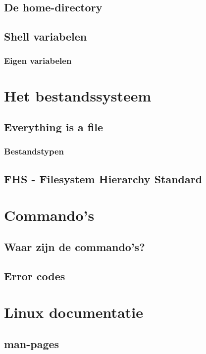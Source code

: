\documentclass[a4paper,12pt,twoside,openright,titlepage]{book}
\begin{document}
\section{De home-directory}

\section{Shell variabelen}

\subsection{Eigen variabelen}


\chapter{Het bestandssysteem}
\section{Everything is a file}

\subsection{Bestandstypen}

\section{FHS - Filesystem Hierarchy Standard}


\chapter{Commando's}

\section{Waar zijn de commando's?}

\section{Error codes}


\chapter{Linux documentatie}

\section{man-pages}

\end{document}
